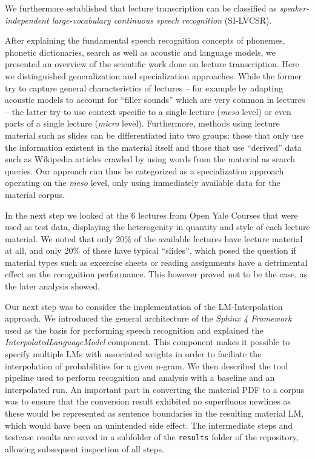 \documentclass[]{article}
\begin{document}
We furthermore established that lecture transcription can be classified
as \emph{speaker-independent large-vocabulary continuous speech
recognition} (SI-LVCSR).

After explaining the fundamental speech recognition concepts of
phonemes, phonetic dictionaries, search as well as acoustic and language
models, we presented an overview of the scientific work done on lecture
transcription. Here we distinguished generalization and specialization
approaches. While the former try to capture general characteristics of
lectures -- for example by adapting acoustic models to account for
``filler sounds'' which are very common in lectures -- the latter try to
use context specific to a single lecture (\emph{meso} level) or even
parts of a single lecture (\emph{micro} level). Furthermore, methods
using lecture material such as slides can be differentiated into two
groups: those that only use the information existent in the material
itself and those that use ``derived'' data such as Wikipedia articles
crawled by using words from the material as search queries. Our approach
can thus be categorized as a specialization approach operating on the
\emph{meso} level, only using immediately available data for the
material corpus.

In the next step we looked at the 6 lectures from Open Yale Courses that
were used as test data, displaying the heterogenity in quantity and
style of each lecture material. We noted that only 20\% of the available
lectures have lecture material at all, and only 20\% of these have
typical ``slides'', which posed the question if material types such as
excercise sheets or reading assignments have a detrimental effect on the
recognition performance. This however proved not to be the case, as the
later analysis showed.

Our next step was to consider the implementation of the LM-Interpolation
approach. We introduced the general architecture of the \emph{Sphinx 4
Framework} used as the basis for performing speech recognition and
explained the \emph{InterpolatedLanguageModel} component. This component
makes it possible to specify multiple LMs with associated weights in
order to faciliate the interpolation of probabilities for a given
n-gram. We then described the tool pipeline used to perform recognition
and analysis with a baseline and an interpolated run. An important part
in converting the material PDF to a corpus was to ensure that the
conversion result exhibited no superfluous newlines as these would be
represented as sentence boundaries in the resulting material LM, which
would have been an unintended side effect. The intermediate steps and
testcase results are saved in a subfolder of the \texttt{results} folder
of the repository, allowing subsequent inspection of all steps.
\end{document}
